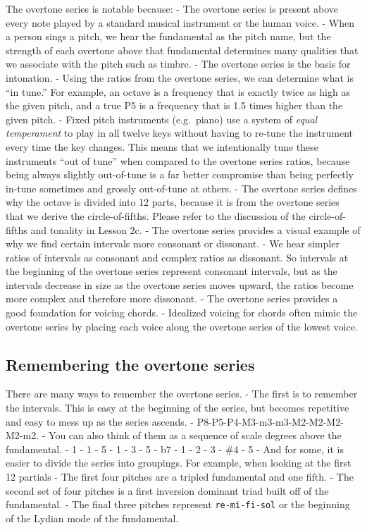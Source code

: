 \documentclass{book}
\begin{document}
The overtone series is notable because: - The overtone series is present above
every note played by a standard musical instrument or the human voice. - When
a person sings a pitch, we hear the fundamental as the pitch name, but the
strength of each overtone above that fundamental determines many qualities
that we associate with the pitch such as timbre. - The overtone series is the
basis for intonation. - Using the ratios from the overtone series, we can
determine what is ``in tune.'' For example, an octave is a frequency that is
exactly twice as high as the given pitch, and a true P5 is a frequency that is
1.5 times higher than the given pitch. - Fixed pitch instruments (e.g.~piano)
use a system of \emph{equal temperament} to play in all twelve keys without
having to re-tune the instrument every time the key changes. This means that
we intentionally tune these instruments ``out of tune'' when compared to the
overtone series ratios, because being always slightly out-of-tune is a far
better compromise than being perfectly in-tune sometimes and grossly
out-of-tune at others. - The overtone series defines why the octave is divided
into 12 parts, because it is from the overtone series that we derive the
circle-of-fifths. Please refer to the discussion of the circle-of-fifths and
tonality in Lesson 2c. - The overtone series provides a visual example of why
we find certain intervals more consonant or dissonant. - We hear simpler
ratios of intervals as consonant and complex ratios as dissonant. So intervals
at the beginning of the overtone series represent consonant intervals, but as
the intervals decrease in size as the overtone series moves upward, the ratios
become more complex and therefore more dissonant. - The overtone series
provides a good foundation for voicing chords. - Idealized voicing for chords
often mimic the overtone series by placing each voice along the overtone
series of the lowest voice.

\hypertarget{remembering-the-overtone-series}{%
\subsection{Remembering the overtone
series}\label{remembering-the-overtone-series}}

There are many ways to remember the overtone series. - The first is to
remember the intervals. This is easy at the beginning of the series, but
becomes repetitive and easy to mess up as the series ascends. -
P8-P5-P4-M3-m3-m3-M2-M2-M2-M2-m2. - You can also think of them as a sequence
of scale degrees above the fundamental. - 1 - 1 - 5 - 1 - 3 - 5 - b7 - 1 - 2 -
3 - \#4 - 5 - And for some, it is easier to divide the series into groupings.
For example, when looking at the first 12 partials - The first four pitches
are a tripled fundamental and one fifth. - The second set of four pitches is a
first inversion dominant triad built off of the fundamental. - The final three
pitches represent \texttt{re-mi-fi-sol} or the beginning of the Lydian mode of
the fundamental.
\end{document}
